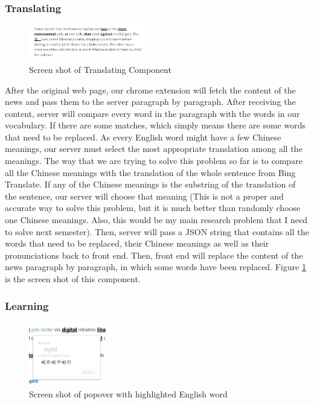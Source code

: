 \subsubsection{Translating}
\begin{figure}[ht]
  \centering
  \includegraphics[width=0.45\textwidth]{software_design_2.jpg}
  \caption{Screen shot of Translating Component}
  \label{fig:software_design_2}
\end{figure}
After the original web page, our chrome extension will fetch the content of the news and pass them to the server paragraph by paragraph. After receiving the content, server will compare every word in the paragraph with the words in our vocabulary. If there are some matches, which simply means there are some words that need to be replaced. As every English word might have a few Chinese meanings, our server must select the most appropriate translation among all the meanings. The way that we are trying to solve this problem so far is to compare all the Chinese meanings with the translation of the whole sentence from Bing Translate. If any of the Chinese meanings is the substring of the translation of the sentence, our server will choose that meaning (This is not a proper and accurate way to solve this problem, but it is much better than randomly choose one Chinese meanings. Also, this would be my main research problem that I need to solve next semester). Then, server will pass a JSON string that contains all the words that need to be replaced, their Chinese meanings as well as their pronunciations back to front end. Then, front end will replace the content of the news paragraph by paragraph, in which some words have been replaced. Figure \ref{fig:software_design_2} is the screen shot of this component.
\\
\subsubsection{Learning}
\begin{figure}[ht]
  \centering
    \includegraphics[width=0.3\textwidth]{software_design_4.jpg}
  \caption{Screen shot of popover with highlighted English word}
  \label{fig:software_design_4}
\end{figure}


